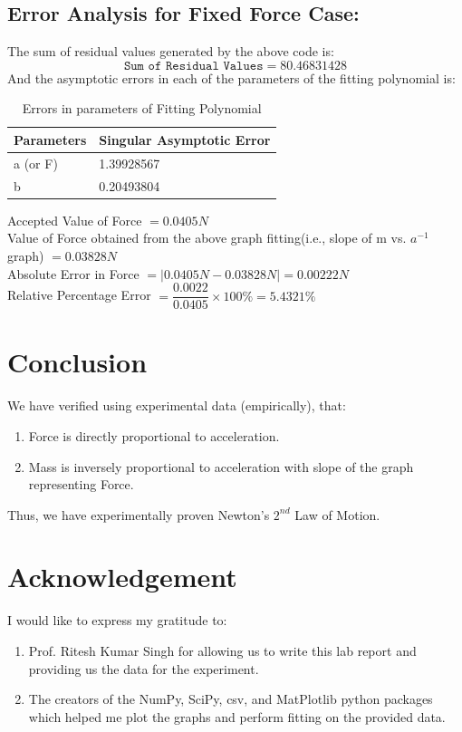 \documentclass{article}
\begin{document}
\subsection{Error Analysis for Fixed Force Case:}

The sum of residual values generated by the above code is:
$$\texttt{Sum\ of\ Residual\ Values} = 80.46831428$$
And the asymptotic errors in each of the parameters of the fitting polynomial is:
\begin{table}[!ht]
	\centering
	\begin{tabular}{|l|l|}
		\hline
		Parameters & Singular Asymptotic Error \\ \hline
		a (or F) & 1.39928567 \\ \hline
		b & 0.20493804 \\ \hline
	\end{tabular}
	\caption{Errors in parameters of Fitting Polynomial}
	\label{error}
\end{table}

Accepted Value of  Force $= 0.0405N$\\
Value of Force obtained from the above graph fitting(i.e., slope of m vs. $a^{-1}$ graph) $= 0.03828N$\\
Absolute Error in Force $= |0.0405N - 0.03828N| = 0.00222N$\\
Relative Percentage Error $= \dfrac{0.0022}{0.0405} \times 100\% = 5.4321\%$

\pagebreak

\section{Conclusion}

We have verified using experimental data (empirically), that:
\begin{enumerate}
	\item Force is directly proportional to acceleration.
	\item Mass is inversely proportional to acceleration with slope of the graph representing Force.
\end{enumerate}

Thus, we have experimentally proven Newton's $2^{nd}$ Law of Motion.

\section{Acknowledgement}
I would like to express my gratitude to:
\begin{enumerate}
	\item Prof. Ritesh Kumar Singh for allowing us to write this lab report and providing us the data for the experiment.
	\item The creators of the NumPy, SciPy, csv, and MatPlotlib python packages which helped me plot the graphs and perform fitting on the provided data.
\end{enumerate}
\end{document}
